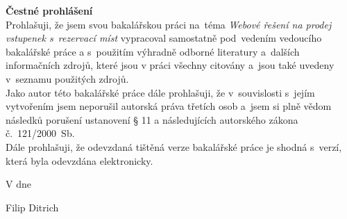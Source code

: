 \newpage
\pagestyle{empty}

\noindent
{\large\bfseries Čestné prohlášení}\\

\noindent
Prohlašuji, že jsem svou bakalářskou práci na~téma \textit{Webové řešení na prodej vstupenek s~rezervací míst} vypracoval samostatně pod~vedením vedoucího bakalářské práce a s~použitím výhradně odborné literatury a~dalších informačních zdrojů, které jsou v práci všechny citovány a~jsou také uvedeny v~seznamu použitých zdrojů.\\

\noindent
Jako autor této bakalářské práce dále prohlašuji, že v~souvislosti s~jejím vytvořením jsem neporušil autorská práva třetích osob a~jsem si plně vědom následků porušení ustanovení § 11 a následujících autorského zákona č.~121/2000~Sb.\\

\noindent
Dále prohlašuji, že odevzdaná tištěná verze bakalářské práce je shodná s~verzí, která byla odevzdána elektronicky.

\vspace{18mm}
\noindent
V \makebox[4cm]{\dotfill} dne \makebox[2.5cm]{\dotfill}
\hspace*{\fill}
\makebox[4cm]{\dotfill}

\begin{flushright}
    \noindent
    Filip Ditrich
\end{flushright}
